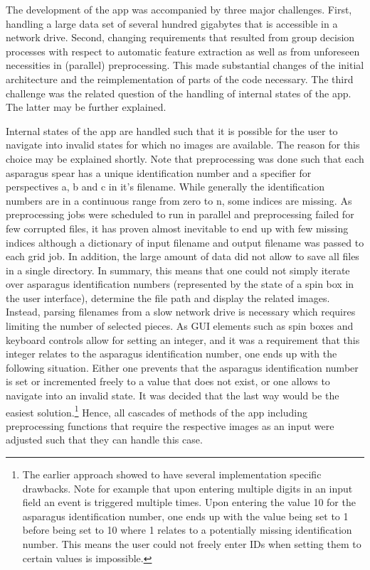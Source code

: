 The development of the app was accompanied by three major challenges. First, handling a large data set of several hundred gigabytes that is accessible in a network drive. Second, changing requirements that resulted from group decision processes with respect to automatic feature extraction as well as from unforeseen necessities in (parallel) preprocessing. This made substantial changes of the initial architecture and the reimplementation of parts of the code necessary. The third challenge was the related question of the handling of internal states of the app. The latter may be further explained. 

Internal states of the app are handled such that it is possible for the user to navigate into invalid states for which no images are available. The reason for this choice may be explained shortly. Note that preprocessing was done such that each asparagus spear has a unique identification number and a specifier for perspectives a, b and c in it’s filename. While generally the identification numbers are in a continuous range from zero to n, some indices are missing. As preprocessing jobs were scheduled to run in parallel and preprocessing failed for few corrupted files, it has proven almost inevitable to end up with few missing indices although a dictionary of input filename and output filename was passed to each grid job. In addition, the large amount of data did not allow to save all files in a single directory. In summary, this means that one could not simply iterate over asparagus identification numbers (represented by the state of a spin box in the user interface), determine the file path and display the related images. Instead, parsing filenames from a slow network drive is necessary which requires limiting the number of selected pieces. As GUI elements such as spin boxes and keyboard controls allow for setting an integer, and it was a requirement that this integer relates to the asparagus identification number, one ends up with the following situation. Either one prevents that the asparagus identification number is set or incremented freely to a value that does not exist, or one allows to navigate into an invalid state. It was decided that the last way would be the easiest solution.\footnote{The earlier approach showed to have several implementation specific drawbacks. Note for example that upon entering multiple digits in an input field an event is triggered multiple times. Upon entering the value 10 for the asparagus identification number, one ends up with the value being set to 1 before being set to 10 where 1 relates to a potentially missing identification number. This means the user could not freely enter IDs when setting them to certain values is impossible.} Hence, all cascades of methods of the app including preprocessing functions that require the respective images as an input were adjusted such that they can handle this case. 

